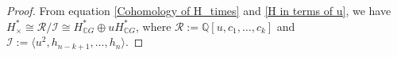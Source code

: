 \documentclass{amsart}
\begin{document}
	
	\begin{proof}
		From equation \eqref{Cohomology of H_times} and \eqref{H in terms of u}, we have $H^*_{\times}\cong \mathcal R/\mathcal I \cong H^*_{\mathbb{C}G} \oplus u H^*_{\mathbb{C}G}$, where $\mathcal R:=\mathbb Q[u,c_1,\ldots,c_k]$ and $\mathcal I:=\langle u^2, h_{n-k+1},\ldots,h_n\rangle$.
		

\end{proof}
\end{document}
